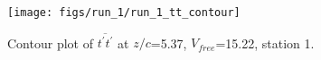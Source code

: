 \begin{figure}[H]
\centering
\texttt{[image: figs/run\_1/run\_1\_tt\_contour]}
\caption{Contour plot of $\overline{t^\prime t^\prime}$ at $z/c$=5.37, $V_{free}$=15.22, station 1.}
\label{fig:run_1_tt_contour}
\end{figure}



